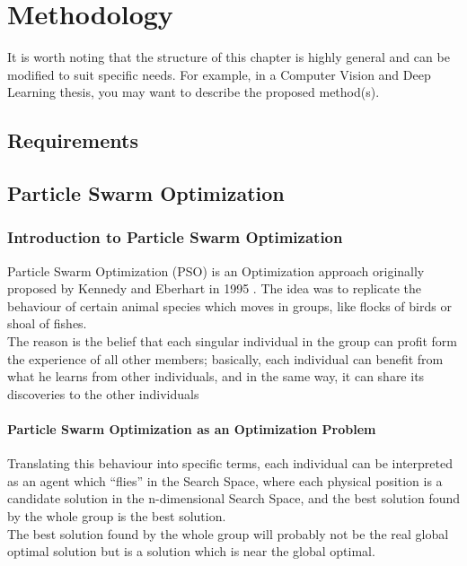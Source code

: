 \chapter{Methodology}

It is worth noting that the structure of this chapter is highly general and can be modified to suit specific needs. For example, in a Computer Vision and Deep Learning thesis, you may want to describe the proposed method(s).

\section{Requirements}

\lipsum  %



\section{Particle Swarm Optimization}


\subsection{Introduction to Particle Swarm Optimization}

Particle Swarm Optimization (PSO) is an Optimization approach originally proposed by Kennedy and Eberhart in 1995 \cite{Tesi-3.3}. The idea was to replicate the behaviour of certain animal species which moves in groups, like flocks of birds or shoal of fishes.
\\[0.3cm]The reason is the belief that each singular individual in the group can profit form the experience of all other members; basically, each individual can benefit from what he learns from other individuals, and in the same way, it can share its discoveries to the other individuals \cite{Tesi-3.1}

\subsubsection{Particle Swarm Optimization as an Optimization Problem}

Translating this behaviour into specific terms, each individual can be interpreted as an agent which “flies” in the Search Space, where each physical position is a candidate solution in the n-dimensional Search Space, and the best solution found by the whole group is the best solution.
\\[0.3cm]The best solution found by the whole group will probably not be the real global optimal solution but is a solution which is near the global optimal.

